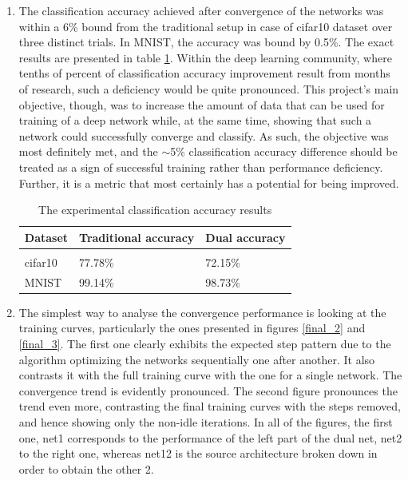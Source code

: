 \documentclass[letterpaper]{article}
\begin{document}
\begin{enumerate}
	\item The classification accuracy achieved after convergence of the networks was within a 6\% bound from the traditional setup in case of cifar10 dataset over three distinct trials. In MNIST, the accuracy was bound by 0.5\%. The exact results are presented in table \ref{results}. Within the deep learning community, where tenths of percent of classification accuracy improvement result from months of research, such a deficiency would be quite pronounced. This project’s main objective, though, was to increase the amount of data that can be used for training of a deep network while, at the same time, showing that such a network could successfully converge and classify. As such, the objective was most definitely met, and the $\mathtt{\sim}$5\% classification accuracy difference should be treated as a sign of successful training rather than performance deficiency. Further, it is a metric that most certainly has a potential for being improved.
	
	\begin{table}[h]
		\caption{The experimental classification accuracy results}
		\label{results}
		\begin{center}
			\begin{tabular}{lll}
				\multicolumn{1}{c}{\bf Dataset}  &\multicolumn{1}{c}{\bf Traditional accuracy} &\multicolumn{1}{c}{\bf Dual accuracy} \\
				\hline \\
				cifar10         &77.78\% &72.15\% \\
				MNIST             &99.14\% &98.73\%\\

			\end{tabular}
		\end{center}
	\end{table}
	
	\item The simplest way to analyse the convergence performance is looking at the training curves, particularly the ones presented in figures \ref{final_2} and \ref{final_3}. The first one clearly exhibits the expected step pattern due to the algorithm optimizing the networks sequentially one after another. It also contrasts it with the full training curve with the one for a single network. The convergence trend is evidently pronounced. The second figure pronounces the trend even more, contrasting the final training curves with the steps removed, and hence showing only the non-idle iterations. In all of the figures, the first one, net1 corresponds to the performance of the left part of the dual net, net2 to the right one, whereas net12 is the source architecture broken down in order to obtain the other 2.
	

\end{enumerate}
\end{document}
